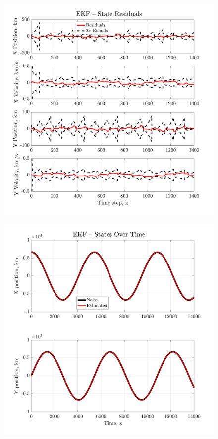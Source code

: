 \documentclass[a4paper]{aiaa-tc}
\begin{document}
  \begin{figure}[H]
 \centering
 \includegraphics[width=\textwidth]{Figures/EKF_residuals.pdf}
 \end{figure}
 
  \begin{figure}[H]
 \centering
 \includegraphics[width=\textwidth]{Figures/EKF_states.pdf}
 \end{figure}
 
\end{document}
